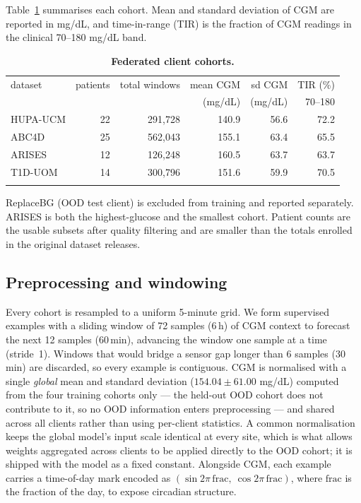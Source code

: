 \documentclass[10pt,letterpaper]{article}
\newlength\savedwidth
\newcommand\thickhline{\noalign{\global\savedwidth\arrayrulewidth\global\arrayrulewidth 2pt}%
\hline
\noalign{\global\arrayrulewidth\savedwidth}}
\begin{document}
Table~\ref{tab:datasets} summarises each cohort. Mean and standard deviation of
CGM are reported in mg/dL, and time-in-range (TIR) is the fraction of CGM
readings in the clinical 70--180 mg/dL band.

\begin{table}[!ht]
\centering
\captionsetup{justification=centering,singlelinecheck=on}
\caption{\bf Federated client cohorts.}
\label{tab:datasets}
\begin{tabular}{lrrrrr}
\thickhline
dataset & patients & total windows & mean CGM & sd CGM & TIR (\%) \\
        &          &               & (mg/dL)  & (mg/dL) & 70--180  \\
\hline
HUPA-UCM & 22 & 291,728 & 140.9 & 56.6 & 72.2 \\
ABC4D    & 25 & 562,043 & 155.1 & 63.4 & 65.5 \\
ARISES   & 12 & 126,248 & 160.5 & 63.7 & 63.7 \\
T1D-UOM  & 14 & 300,796 & 151.6 & 59.9 & 70.5 \\
\thickhline
\end{tabular}
\begin{center}
{\small ReplaceBG (OOD test client) is excluded from training and reported
separately. ARISES is both the highest-glucose and the smallest cohort. Patient
counts are the usable subsets after quality filtering and are smaller than the
totals enrolled in the original dataset releases.}
\end{center}
\end{table}

\subsection*{Preprocessing and windowing}

Every cohort is resampled to a uniform 5-minute grid. We form supervised
examples with a sliding window of 72 samples (6\,h) of CGM context to forecast
the next 12 samples (60\,min), advancing the window one sample at a time
(stride~1). Windows that would bridge a sensor gap longer than 6 samples
(30\,min) are discarded, so every example is contiguous. CGM is normalised with
a single \emph{global} mean and standard deviation ($154.04 \pm 61.00$ mg/dL)
computed from the four training cohorts only --- the held-out OOD cohort does not
contribute to it, so no OOD information enters preprocessing --- and shared
across all clients rather than using per-client statistics. A common
normalisation keeps the global model's input scale identical at every site,
which is what allows weights aggregated across clients to be applied directly to
the OOD cohort; it is shipped with the model as a fixed constant. Alongside CGM,
each example carries a time-of-day mark encoded
as $(\sin 2\pi\,\mathrm{frac},\ \cos 2\pi\,\mathrm{frac})$, where $\mathrm{frac}$
is the fraction of the day, to expose circadian structure.
\end{document}
